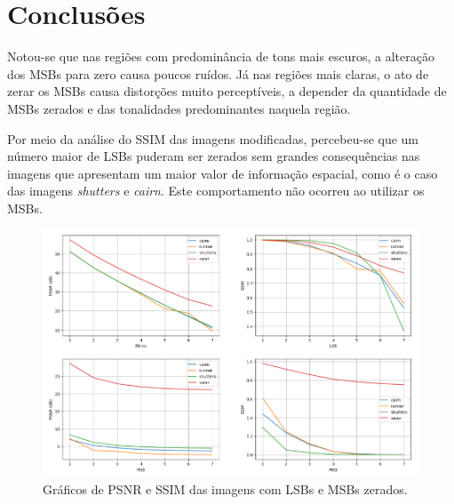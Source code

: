 \chapter[Conclusões]{Conclusões}

Notou-se que nas regiões com predominância de tons mais escuros, a alteração dos MSBs para zero causa poucos ruídos. Já nas regiões mais claras, o ato de zerar os MSBs causa distorções muito perceptíveis, a depender da quantidade de MSBs zerados e das tonalidades predominantes naquela região. 

Por meio da análise do SSIM das imagens modificadas, percebeu-se que um número maior de LSBs puderam ser zerados sem grandes consequências nas imagens que apresentam um maior valor de informação espacial, como é o caso das imagens \textit{shutters} e \textit{cairn}. Este comportamento não ocorreu ao utilizar os MSBs.

\begin{figure}
    \includegraphics[width=1\linewidth]{Elementos/Figuras/graficos_lsb_msb.png}
    \caption{Gráficos de PSNR e SSIM das imagens com LSBs e MSBs zerados.}
\end{figure}
